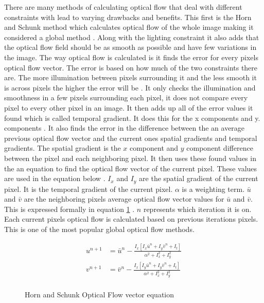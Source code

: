 \documentclass{article}
\begin{document}
  There are many methods of calculating optical flow that deal with different constraints with lead to varying drawbacks and benefits. This first is the Horn and Schunk method which calculates optical flow of the whole image making it considered a global method \cite{odonovan_optical_2005}. Along with the lighting constraint it also adds that the optical flow field should be as smooth as possible and have few variations in the image. The way optical flow is calculated is it finds the error for every pixels optical flow vector. The error is based on how much of the two constraints there are. The more illumination between pixels surrounding it and the less smooth it is across pixels the higher the error will be \cite{odonovan_optical_2005}. It only checks the illumination and smoothness in a few pixels surrounding each pixel, it does not compare every pixel to every other pixel in an image. It then adds up all of the error values it found which is called temporal gradient. It does this for the x components and y. components \cite{odonovan_optical_2005}. It also finds the error in the difference between the an average previous optical flow vector and the current ones spatial gradients and temporal gradients. The spatial gradient is the $x$ component and $y$ component difference between the pixel and each neighboring pixel. It then uses these found values in the an equation to find the optical flow vector of the current pixel. These values are used in the equation below \cite{odonovan_optical_2005}. $I_x$  and $I_y$  are the spatial gradient of the current pixel. It  is the temporal gradient of the current pixel. $\alpha$ is a weighting term. $\bar{u}$ and $\bar{v}$ are the neighboring pixels average optical flow vector values for $\bar{u}$ and $\bar{v}$. This is expressed formally in equation \ref{eq:hotnandschunk} \cite{odonovan_optical_2005}. $n$ represents which iteration it is on. Each current pixels optical flow is calculated based on previous iterations pixels. This is one of the most popular global optical flow methods.

      \begin{figure}
        \centering
        \begin{equation}
          \begin{split}
            u^{n+1} &= \bar{u}^n-\frac{I_x[I_x\bar{u}^n+I_y\bar{v}^n+I_t]}{\alpha^2+I_x^2+I_y^2} \\
            v^{n+1} &= \bar{v}^n-\frac{I_x[I_y\bar{u}^n+I_y\bar{v}^n+I_t]}{\alpha^2+I_x^2+I_y^2} \\
          \end{split}
        \end{equation}
        \caption{Horn and Schunk Optical Flow vector equation}
        \label{eq:hotnandschunk}
      \end{figure}
\end{document}
